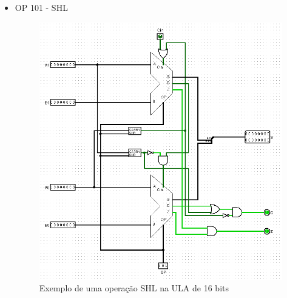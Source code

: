 \documentclass[
	12pt,				%
	openright,			%
	twoside,			%
	a4paper,			%
	english,			%
	french,				%
	spanish,			%
	brazil,				%
	]{abntex2}
\begin{document}
\begin{apendicesenv}
\begin{itemize}
\newpage
\item{OP 101 - SHL}
\begin{figure}[h]
	\begin{center}
	    \includegraphics[scale=0.55]{imagens/ULA16SHL.png}
	\end{center}
\caption{\label{ula16shl}Exemplo de uma operação SHL na ULA de 16 bits}
\end{figure}


\end{itemize}
\end{apendicesenv}
\end{document}
